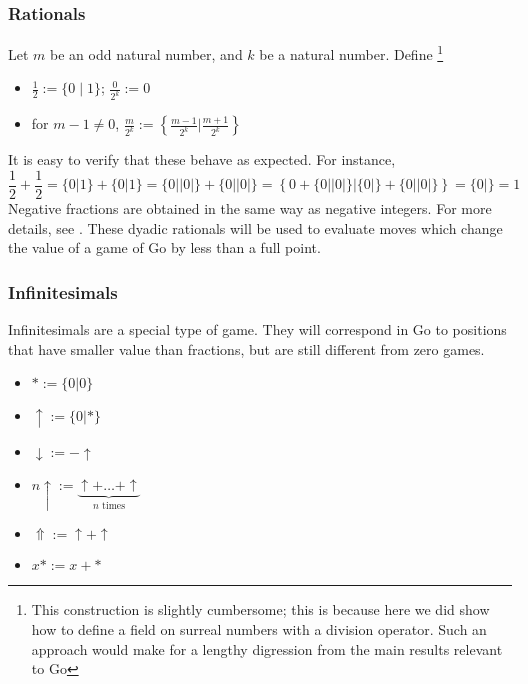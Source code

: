 \documentclass[../math194_paper.tex]{subfiles}
\begin{document}
\subsubsection{Rationals}

\begin{definition} 
\label{dyadic}
Let $m$ be an odd natural number, and $k$ be a natural 
number. Define \footnote{This construction is slightly cumbersome; this is because 
here we did show how to define a field on surreal numbers with a division operator.
Such an approach would make for a lengthy digression from the main results relevant 
to Go}
\begin{itemize}
    \item $\frac{1}{2} := \{0 \mid 1\}$; \quad  $\frac{0}{2^k} := 0$ 
    \item for $m-1 \neq 0$, $\frac{m}{2^k} := \left\{ \frac{m-1}{2^k} \Bigg| \frac{m+1}{2^k} \right\}$
\end{itemize}
\end{definition}

It is easy to verify that these behave as expected. For instance, 
\[
    \frac{1}{2} + \frac{1}{2} = \{0|1\} + \{0|1\} = \{0||0|\} + \{0||0|\} = 
    \left\{ 0 + \{0||0|\} |  \{0|\} + \{0||0|\} \right\} = \{0|\} = 1
\]
Negative fractions are obtained in the same way as negative integers.
For more details, see \cite[\S 0, \S 1]{conway2000numbers}.
These dyadic rationals will be used to evaluate moves which change the value of a game of Go by less than 
a full point.

\subsubsection{Infinitesimals} \label{infinitesimals}

Infinitesimals are a special type of game. They will correspond in Go to positions 
that have smaller value than fractions, but are still different from zero games.  
\begin{definition}
\begin{itemize} \label{basic_infinitesimals} \:
    \item $* := \{0 | 0 \}$
    \item $\uparrow := \{0 | * \}$
    \item $\downarrow := - \uparrow$
\end{itemize}

\begin{definition} \label{derived_infinitesimals} \:
\begin{itemize}
    \item $n \uparrow := \underbrace{\uparrow + \ldots + \uparrow}_{n \text{ times}}$
    \item $\Uparrow := \uparrow + \uparrow$
    \item $x* := x + *$
\end{itemize}
\end{definition}
\end{definition}
\end{document}
